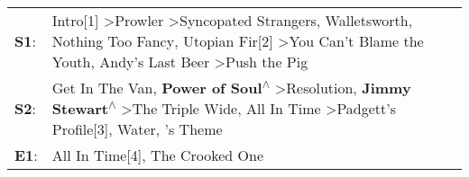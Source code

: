 \begin{supertabular}{p{0.03\textwidth}p{0.92\textwidth}}
 \textbf{S1}:  &    Intro[1]\textsuperscript{} \textgreater \enspace Prowler\textsuperscript{} \textgreater \enspace Syncopated Strangers\textsuperscript{}, \enspace Walletsworth\textsuperscript{}, \enspace Nothing Too Fancy\textsuperscript{}, \enspace Utopian Fir[2]\textsuperscript{} \textgreater \enspace You Can't Blame the Youth\textsuperscript{}, \enspace Andy's Last Beer\textsuperscript{} \textgreater \enspace Push the Pig\textsuperscript{}  \enspace  \\
 \textbf{S2}:  &  Get In The Van\textsuperscript{}, \enspace \textbf{Power of Soul\textsuperscript{$\wedge$}} \textgreater \enspace Resolution\textsuperscript{}, \enspace \textbf{Jimmy Stewart\textsuperscript{$\wedge$}} \textgreater \enspace The Triple Wide\textsuperscript{}, \enspace All In Time\textsuperscript{} \textgreater \enspace Padgett's Profile[3]\textsuperscript{}, \enspace Water\textsuperscript{}, 's Theme\textsuperscript{}  \enspace  \\
 \textbf{E1}:  &                                                                                                                                                                                                                                                                                                                                                                     All In Time[4]\textsuperscript{}, \enspace The Crooked One\textsuperscript{}  \enspace  \\
\end{supertabular}
